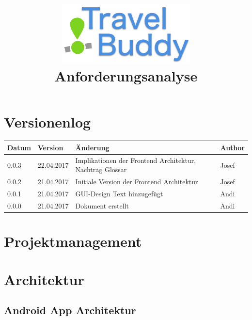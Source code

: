 \documentclass[a4paper,10pt,xetex]{article}
\title{
  \includegraphics[width=7cm]{travel-buddy_white}\\[\bigskipamount]
  Anforderungsanalyse\\[\bigskipamount]
}
\author{\documentauthors}
\date{\parbox{\linewidth}{\centering%
  IT15TA ZH \hspace*{3cm} Gruppe 3\endgraf\bigskip
  \documentdate\endgraf
}}
\begin{document}
\maketitle\newpage

{
\hypersetup{linkcolor=black}
\setcounter{tocdepth}{3}
\tableofcontents
}

\newpage

\section{Versionenlog}\label{versionenlog}

\tabulinesep=1.2mm

\begin{longtabu} to \textwidth { | l | l | X[l] | l | }
  \hline
  \textbf{Datum} & \textbf{Version} & \textbf{Änderung} & \textbf{Author} \\
  \hline
  \endhead

  0.0.3 & 22.04.2017 & Implikationen der Frontend Architektur, Nachtrag Glossar & Josef \\
  \hline
  
  0.0.2 & 21.04.2017 & Initiale Version der Frontend Architektur & Josef \\
  \hline

  0.0.1 & 21.04.2017 & GUI-Design Text hinzugefügt & Andi\\
  \hline

  0.0.0 & 21.04.2017 & Dokument erstellt & Andi\\
  \hline
\end{longtabu}
\newpage

\section{Projektmanagement}\label{projektmanagement}
\section{Architektur}\label{architektur}
\subsection{Android App Architektur}\label{androidapparchitektur}
\end{document}
